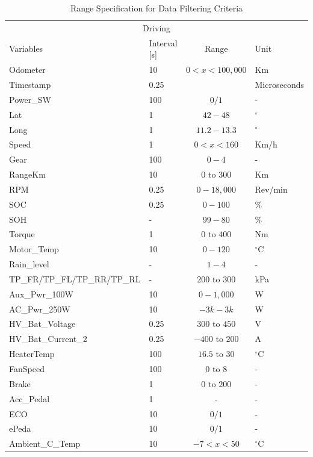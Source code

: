 \begin{table}[!ht]
    \begin{center}
    \caption{Range Specification for Data Filtering Criteria}
    \label{tab:filtering_criteria}
    \begin{tabular}{llcl}
    \toprule
    \multicolumn{4}{c}{Driving} \\ 
    Variables & Interval [s] & Range & Unit \\ 
    \midrule
    Odometer & 10 & $0 < x < 100,000$ & Km \\ 
    Timestamp & 0.25 & ~ & Microseconds \\ 
    Power\_SW & 100 & $0/1$ & - \\ 
    Lat & 1 &$42-48$ & $^\circ$ \\ 
    Long & 1 & $11.2 - 13.3$ & $^\circ$ \\ 
    Speed & 1 & $0 < x < 160$ & Km/h \\ 
    Gear & 100 & $0-4$ & - \\ 
    RangeKm & 10 & $0$ to $300$  & Km \\ 
    RPM & 0.25 & $0 - 18,000$ & Rev/min \\ 
    SOC & 0.25 & $0-100$ & \% \\ 
    SOH & - & $99 - 80$ & \% \\ 
    Torque & 1 & $0$ to $400$ & Nm \\ 
    Motor\_Temp & 10 & $0-120$ & $^\circ$C \\ 
    Rain\_level & - & $1-4$ & - \\ 
    TP\_FR/TP\_FL/TP\_RR/TP\_RL & - & $200$ to $300$ & kPa \\ 
    Aux\_Pwr\_100W & 10 &  $0-1,000$ & W \\ 
    AC\_Pwr\_250W & 10 & $-3k-3k$ & W \\ 
    HV\_Bat\_Voltage & 0.25 & $300$ to $450$ & V \\ 
    HV\_Bat\_Current\_2 & 0.25 & $-400$ to $200$ & A \\ 
    HeaterTemp & 100 & $16.5$ to $30$ & $^\circ$C \\ 
    FanSpeed & 100 & $0$ to $8$ & - \\ 
    Brake & 1 & $0$ to $200$  & - \\ 
    Acc\_Pedal & 1 & - & - \\ 
    ECO & 10 & $0/1$ & - \\ 
    ePeda & 10 & $0/1$ & - \\ 
    Ambient\_C\_Temp & 10 & $-7 < x < 50$ & $^\circ$C \\ 

\end{tabular}
\end{center}
\end{table}
